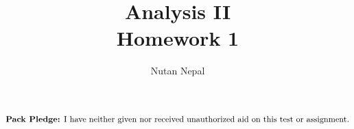\documentclass[12pt]{article}
\title{Analysis II \\
\large Homework 1
}
\author{Nutan Nepal}
\newcommand{\packpledge}{
    $\text{{\bf Pack Pledge:} I have neither given nor
    received unauthorized aid on this
    test or assignment.}$}
\begin{document}
\maketitle
\packpledge\\
\makebox[\linewidth]{\rule{200mm}{1pt}}
\vspace{1mm}


\newcommand{\mR}{\mathbb{R}}
\newcommand{\mN}{\mathbb{N}}
\newcommand{\mC}{\mathbb{C}}
\newcommand{\mQ}{\mathbb{Q}}
\newcommand{\cP}{\mathcal{P}}
\newcommand{\cB}{\mathcal{B}}
\newcommand{\cM}{\mathcal{M}}
\newcommand{\ds}{\displaystyle}
\newcommand{\al}{\alpha}
\newcommand{\li}{l^{\infty}}
\newcommand{\ep}{\varepsilon}
\newcommand{\de}{\delta}
\newcommand{\T}{\mathcal{T}}
\newcommand{\linf}{l^{\infty}}
\newcommand{\cD}{\mathcal{D}}
\newcommand{\cR}{\mathcal{R}}
\newcommand{\cN}{\mathcal{N}}
\newcommand{\lsn}{\limsup_{n \to \infty}}
\newcommand{\lin}{\liminf_{n \to \infty}}
\newcommand{\eq}{\Leftrightarrow}
\end{document}
